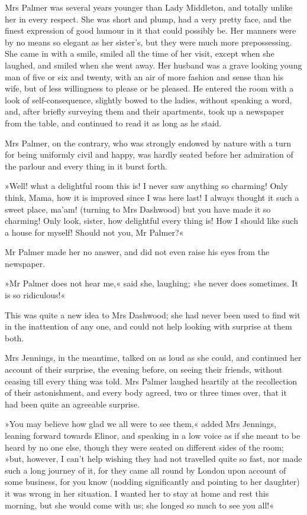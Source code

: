 Mrs Palmer was several years younger than Lady Middleton, and totally unlike her in every respect. She was short and plump, had a very pretty face, and the finest expression of good humour in it that could possibly be. Her manners were by no means so elegant as her sister’s, but they were much more prepossessing. She came in with a smile, smiled all the time of her visit, except when she laughed, and smiled when she went away. Her husband was a grave looking young man of five or six and twenty, with an air of more fashion and sense than his wife, but of less willingness to please or be pleased. He entered the room with a look of self-consequence, slightly bowed to the ladies, without speaking a word, and, after briefly surveying them and their apartments, took up a newspaper from the table, and continued to read it as long as he staid.

Mrs Palmer, on the contrary, who was strongly endowed by nature with a turn for being uniformly civil and happy, was hardly seated before her admiration of the parlour and every thing in it burst forth.

»Well! what a delightful room this is! I never saw anything so charming! Only think, Mama, how it is improved since I was here last! I always thought it such a sweet place, ma’am! (turning to Mrs Dashwood) but you have made it so charming! Only look, sister, how delightful every thing is! How I should like such a house for myself! Should not you, Mr Palmer?«

Mr Palmer made her no answer, and did not even raise his eyes from the newspaper.

»Mr Palmer does not hear me,« said she, laughing; »he never does sometimes. It is so ridiculous!«

This was quite a new idea to Mrs Dashwood; she had never been used to find wit in the inattention of any one, and could not help looking with surprise at them both.

Mrs Jennings, in the meantime, talked on as loud as she could, and continued her account of their surprise, the evening before, on seeing their friends, without ceasing till every thing was told. Mrs Palmer laughed heartily at the recollection of their astonishment, and every body agreed, two or three times over, that it had been quite an agreeable surprise.

»You may believe how glad we all were to see them,« added Mrs Jennings, leaning forward towards Elinor, and speaking in a low voice as if she meant to be heard by no one else, though they were seated on different sides of the room; »but, however, I can’t help wishing they had not travelled quite so fast, nor made such a long journey of it, for they came all round by London upon account of some business, for you know (nodding significantly and pointing to her daughter) it was wrong in her situation. I wanted her to stay at home and rest this morning, but she would come with us; she longed so much to see you all!«

